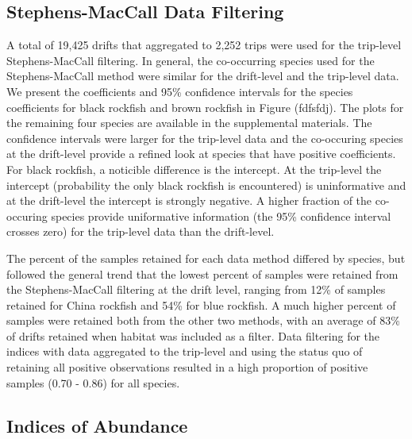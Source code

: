 \documentclass[
  12pt,
  authoryear,
  preprint,
  3p]{elsarticle}
\begin{document}
\hypertarget{stephens-maccall-data-filtering-1}{%
\subsection{Stephens-MacCall Data
Filtering}\label{stephens-maccall-data-filtering-1}}

A total of 19,425 drifts that aggregated to 2,252 trips were used for
the trip-level Stephens-MacCall filtering. In general, the co-occurring
species used for the Stephens-MacCall method were similar for the
drift-level and the trip-level data. We present the coefficients and
95\% confidence intervals for the species coefficients for black
rockfish and brown rockfish in Figure (fdfsfdj). The plots for the
remaining four species are available in the supplemental materials. The
confidence intervals were larger for the trip-level data and the
co-occuring species at the drift-level provide a refined look at species
that have positive coefficients. For black rockfish, a noticible
difference is the intercept. At the trip-level the intercept
(probability the only black rockfish is encountered) is uninformative
and at the drift-level the intercept is strongly negative. A higher
fraction of the co-occuring species provide uniformative information
(the 95\% confidence interval crosses zero) for the trip-level data than
the drift-level.

The percent of the samples retained for each data method differed by
species, but followed the general trend that the lowest percent of
samples were retained from the Stephens-MacCall filtering at the drift
level, ranging from 12\% of samples retained for China rockfish and 54\%
for blue rockfish. A much higher percent of samples were retained both
from the other two methods, with an average of 83\% of drifts retained
when habitat was included as a filter. Data filtering for the indices
with data aggregated to the trip-level and using the status quo of
retaining all positive observations resulted in a high proportion of
positive samples (0.70 - 0.86) for all species.

\hypertarget{indices-of-abundance-1}{%
\subsection{Indices of Abundance}\label{indices-of-abundance-1}}
\end{document}
